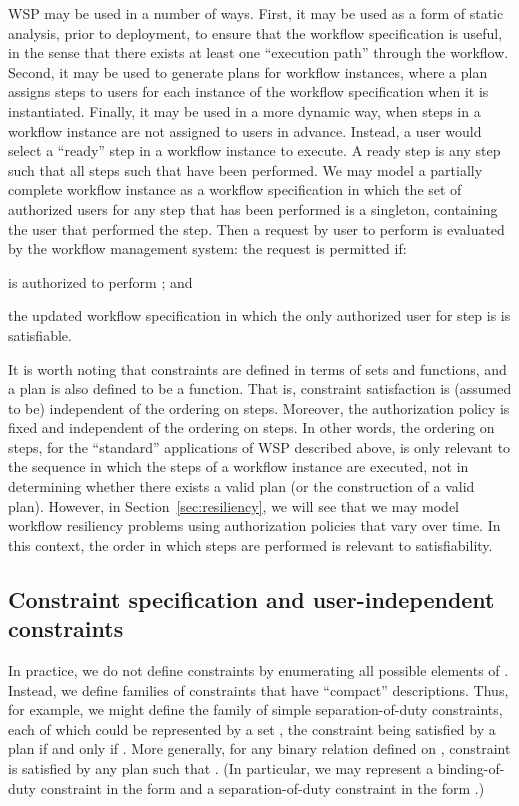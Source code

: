 \documentclass[jcs,crcready]{iosart1c}
\begin{document}
WSP may be used in a number of ways. 
First, it may be used as a form of static analysis, prior to deployment, to ensure that the workflow specification is useful, in the sense that there exists at least one ``execution path'' through the workflow. 
Second, it may be used to generate plans for workflow instances, where a plan assigns steps to users for each instance of the workflow specification when it is instantiated. 
Finally, it may be used in a more dynamic way, when steps in a workflow instance are not assigned to users in advance. Instead, a user would select a ``ready'' step in a workflow instance to execute. A ready step is any step  such that all steps  such that  have been performed. 
We may model a partially complete workflow instance as a workflow specification in which the set of authorized users for any step that has been performed is a singleton, containing the user that performed the step.
Then a request by user  to perform  is evaluated by the workflow management system: the request is permitted if:
\begin{inparaenum}[(i)]\item  is authorized to perform ; and
 \item the updated workflow specification in which the only authorized user for step  is  is satisfiable.
\end{inparaenum}

It is worth noting that constraints are defined in terms of sets and functions, and a plan is also defined to be a function. That is, constraint satisfaction is (assumed to be) independent of the ordering on steps. 
Moreover, the authorization policy is fixed and independent of the ordering on steps. In other words, the ordering on steps, for the ``standard'' applications of WSP described above, is only relevant to the sequence in which the steps of a workflow instance are executed, not in determining whether there exists a valid plan (or the construction of a valid plan). 
However, in Section~\ref{sec:resiliency}, we will see that we may model workflow resiliency problems using authorization policies that vary over time. In this context, the order in which steps are performed is relevant to satisfiability.

\subsection{Constraint specification and user-independent constraints}
\label{sec:ui-constraints}

In practice, we do not define constraints by enumerating all possible elements of .
Instead, we define families of constraints that have ``compact'' descriptions.
Thus, for example, we might define the family of simple separation-of-duty constraints, each of which could be represented by a set , the constraint being satisfied by a plan  if and only if .
More generally, for any binary relation  defined on , constraint  is satisfied by any plan  such that .
(In particular, we may represent a binding-of-duty constraint in the form  and a separation-of-duty constraint in the form .)
\end{document}
